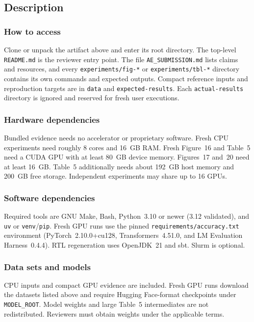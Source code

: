 \documentclass{sigplanconf}
\begin{document}
\subsection{Description}

\subsubsection{How to access}

Clone or unpack the artifact above and enter its root directory.  The top-level
\texttt{README.md} is the reviewer entry point.  The file
\texttt{AE\_SUBMISSION.md} lists claims and resources, and every
\texttt{experiments/fig-*} or
\texttt{experiments/tbl-*} directory contains its own commands and expected
outputs.  Compact reference inputs and reproduction targets are in
\texttt{data} and \texttt{expected-results}.  Each \texttt{actual-results}
directory is ignored and reserved for fresh user executions.

\subsubsection{Hardware dependencies}

Bundled evidence needs no accelerator or proprietary software.  Fresh CPU
experiments need roughly 8 cores and 16~GB RAM.  Fresh Figure~16 and Table~5
need a CUDA GPU with at least 80~GB device memory.  Figures~17 and~20 need at
least 16~GB.  Table~5 additionally needs about 192~GB host memory and 200~GB
free storage.  Independent experiments may share up to 16 GPUs.

\subsubsection{Software dependencies}

Required tools are GNU Make, Bash, Python~3.10 or newer (3.12 validated), and
\texttt{uv} or \texttt{venv}/\texttt{pip}.  Fresh GPU runs use the pinned
\texttt{requirements/accuracy.txt} environment (PyTorch~2.10.0+cu128,
Transformers~4.51.0, and LM Evaluation Harness~0.4.4).  RTL regeneration uses
OpenJDK~21 and sbt.  Slurm is optional.

\subsubsection{Data sets and models}

CPU inputs and compact GPU evidence are included.  Fresh GPU runs download the
datasets listed above and require Hugging Face-format checkpoints under
\texttt{MODEL\_ROOT}.  Model weights and large Table~5 intermediates are not
redistributed.  Reviewers must obtain weights under the applicable terms.
\end{document}
